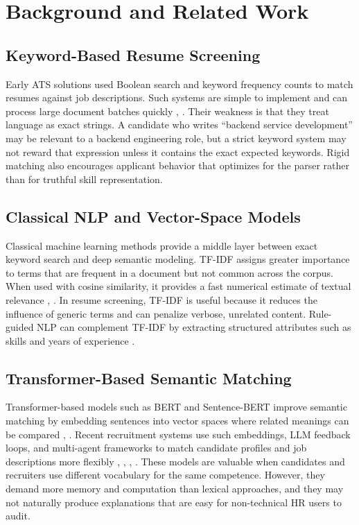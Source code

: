 \section{Background and Related Work}
\subsection{Keyword-Based Resume Screening}
Early ATS solutions used Boolean search and keyword frequency counts to match resumes against job descriptions. Such systems are simple to implement and can process large document batches quickly \cite{b1}, \cite{b3}. Their weakness is that they treat language as exact strings. A candidate who writes ``backend service development'' may be relevant to a backend engineering role, but a strict keyword system may not reward that expression unless it contains the exact expected keywords. Rigid matching also encourages applicant behavior that optimizes for the parser rather than for truthful skill representation.

\subsection{Classical NLP and Vector-Space Models}
Classical machine learning methods provide a middle layer between exact keyword search and deep semantic modeling. TF-IDF assigns greater importance to terms that are frequent in a document but not common across the corpus. When used with cosine similarity, it provides a fast numerical estimate of textual relevance \cite{b7}, \cite{b10}. In resume screening, TF-IDF is useful because it reduces the influence of generic terms and can penalize verbose, unrelated content. Rule-guided NLP can complement TF-IDF by extracting structured attributes such as skills and years of experience \cite{b16}.

\subsection{Transformer-Based Semantic Matching}
Transformer-based models such as BERT and Sentence-BERT improve semantic matching by embedding sentences into vector spaces where related meanings can be compared \cite{b6}, \cite{b12}. Recent recruitment systems use such embeddings, LLM feedback loops, and multi-agent frameworks to match candidate profiles and job descriptions more flexibly \cite{b2}, \cite{b5}, \cite{b11}, \cite{b13}. These models are valuable when candidates and recruiters use different vocabulary for the same competence. However, they demand more memory and computation than lexical approaches, and they may not naturally produce explanations that are easy for non-technical HR users to audit.


